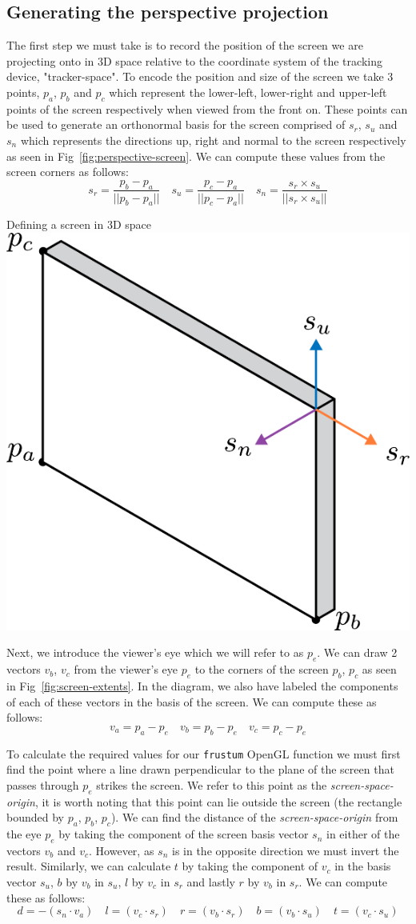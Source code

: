 \subsection{Generating the perspective projection}

The first step we must take is to record the position of the screen we are projecting onto in 3D space relative to the coordinate system of the tracking device, "tracker-space". To encode the position and size of the screen we take 3 points, $p_a$, $p_b$ and $p_c$ which represent the lower-left, lower-right and upper-left points of the screen respectively when viewed from the front on. These points can be used to generate an orthonormal basis for the screen comprised of $s_r$, $s_u$ and $s_n$ which represents the directions up, right and normal to the screen respectively as seen in Fig~\ref{fig:perspective-screen}. We can compute these values from the screen corners as follows:
\[s_r = \frac{p_b-p_a}{||p_b-p_a||} \quad s_u = \frac{p_c-p_a}{||p_c-p_a||} \quad s_n = \frac{s_r\times s_u}{||s_r \times s_u||}\]

\begin{figureBox}[label={fig:perspective-screen}, width=0.8\linewidth]{Defining a screen in 3D space}
    \includegraphics[width = 0.3\linewidth]{./background/figures/projection/screen.pdf}
\end{figureBox}

Next, we introduce the viewer's eye which we will refer to as $p_e$. We can draw 2 vectors $v_b$, $v_c$ from the viewer's eye $p_e$ to the corners of the screen $p_b$, $p_c$ as seen in Fig~\ref{fig:screen-extents}. In the diagram, we also have labeled the components of each of these vectors in the basis of the screen. We can compute these as follows:
\[ v_a = p_a - p_e \quad v_b = p_b - p_e \quad v_c = p_c - p_e\] 

To calculate the required values for our \texttt{frustum} OpenGL function we must first find the point where a line drawn perpendicular to the plane of the screen that passes through $p_e$ strikes the screen. We refer to this point as the {\it screen-space-origin}, it is worth noting that this point can lie outside the screen (the rectangle bounded by $p_a$, $p_b$, $p_c$). We can find the distance of the {\it screen-space-origin} from the eye $p_e$ by taking the component of the screen basis vector $s_n$ in either of the vectors $v_b$ and $v_c$. However, as $s_n$ is in the opposite direction we must invert the result. Similarly, we can calculate $t$ by taking the component of $v_c$ in the basis vector $s_u$, $b$ by $v_b$ in $s_u$, $l$ by $v_c$ in $s_r$ and lastly $r$ by $v_b$ in $s_r$. We can compute these as follows:
\[ d= -(s_n \cdot v_a) \quad l = (v_c \cdot s_r) \quad r = (v_b \cdot s_r) \quad b = (v_b \cdot s_u) \quad t = (v_c \cdot s_u) \]

